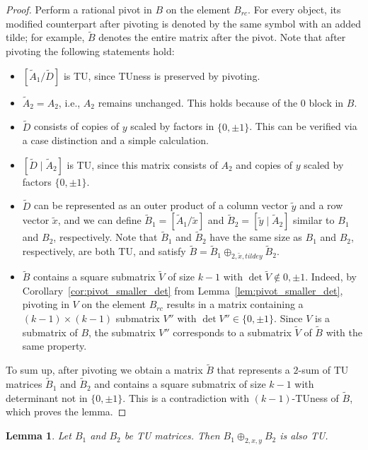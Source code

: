 \documentclass{article}
\newtheorem{lemma}{Lemma}
\theoremstyle{definition}
\begin{document}
\begin{proof}
    Perform a rational pivot in $B$ on the element $B_{rc}$. For every object, its modified counterpart after pivoting is denoted by the same symbol with an added tilde; for example, $\tilde{B}$ denotes the entire matrix after the pivot. Note that after pivoting the following statements hold:
    \begin{itemize}
        \item $\left[\tilde{A}_{1} / \tilde{D}\right]$ is TU, since TUness is preserved by pivoting.
        \item $\tilde{A}_{2} = A_{2}$, i.e., $A_{2}$ remains unchanged. This holds because of the $0$ block in $B$.
        \item $\tilde{D}$ consists of copies of $y$ scaled by factors in $\{0, \pm 1\}$. This can be verified via a case distinction and a simple calculation.
        \item $\left[\tilde{D} \mid \tilde{A}_{2}\right]$ is TU, since this matrix consists of $A_{2}$ and copies of $y$ scaled by factors $\{0, \pm 1\}$.
        \item $\tilde{D}$ can be represented as an outer product of a column vector $\tilde{y}$ and a row vector $\tilde{x}$, and we can define $\tilde{B}_{1} = \left[\tilde{A}_{1} / \tilde{x}\right]$ and $\tilde{B}_{2} = \left[\tilde{y} \mid \tilde{A}_{2}\right]$ similar to $B_{1}$ and $B_{2}$, respectively. Note that $\tilde{B}_{1}$ and $\tilde{B}_{2}$ have the same size as $B_{1}$ and $B_{2}$, respectively, are both TU, and satisfy $\tilde{B} = \tilde{B}_{1} \oplus_{2, \tilde{x}, tilde{y}} \tilde{B}_{2}$.
        \item $\tilde{B}$ contains a square submatrix $\tilde{V}$ of size $k - 1$ with $\det \tilde{V} \notin {0, \pm 1}$. Indeed, by Corollary~\ref{cor:pivot_smaller_det} from Lemma~\ref{lem:pivot_smaller_det}, pivoting in $V$ on the element $B_{rc}$ results in a matrix containing a $(k - 1) \times (k - 1)$ submatrix $V''$ with $\det V'' \in \{0, \pm 1\}$. Since $V$ is a submatrix of $B$, the submatrix $V''$ corresponds to a submatrix $\tilde{V}$ of $\tilde{B}$ with the same property.
    \end{itemize}
    To sum up, after pivoting we obtain a matrix $\tilde{B}$ that represents a $2$-sum of TU matrices $\tilde{B}_{1}$ and $\tilde{B}_{2}$ and contains a square submatrix of size $k - 1$ with determinant not in $\{0, \pm 1\}$. This is a contradiction with $(k - 1)$-TUness of $\tilde{B}$, which proves the lemma.
\end{proof}

\begin{lemma}
    Let $B_{1}$ and $B_{2}$ be TU matrices. Then $B_{1} \oplus_{2, x, y} B_{2}$ is also TU.
\end{lemma}
\end{document}
